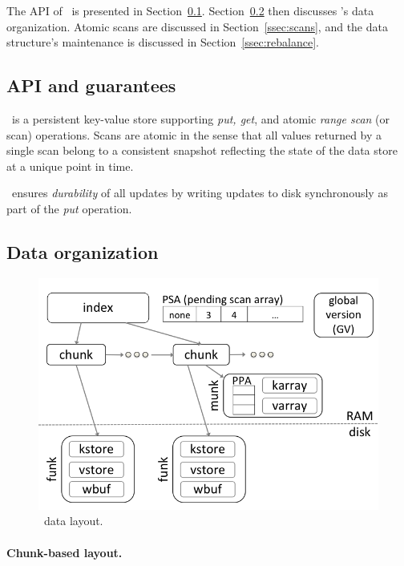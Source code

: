 

The API of \sys\ is presented in Section~\ref{ssec:api}. 
Section~\ref{ssec:layout} then discusses \sys's data organization. 
Atomic scans are discussed in Section~\ref{ssec:scans}, and 
the data structure's maintenance is discussed in Section~\ref{ssec:rebalance}.

\subsection{API and guarantees}
\label{ssec:api}

\sys\ is a persistent key-value store supporting \emph{put, get}, and atomic \emph{range scan} (or scan) operations. 
Scans are atomic in the sense that all values returned by a single scan belong to a consistent snapshot reflecting
the state of the data store at a unique point in time.


\sys\ ensures \emph{durability} of all updates by writing updates to disk synchronously as part of the \emph{put} operation.

\subsection{Data organization}
\label{ssec:layout}

\begin{figure}[htb]
\centerline{
\includegraphics[width=0.9\columnwidth]{PiWi.png}
}
\caption{\sys\ data layout.}
\label{fig:layout}
\end{figure}

\paragraph{Chunk-based layout.}

